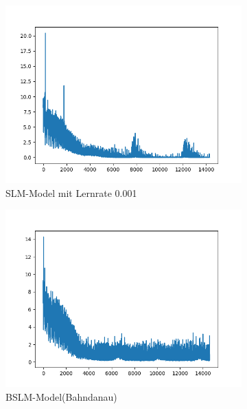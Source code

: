 \begin{figure}[p]
	\centering
	\begin{subfigure}[H]{\textwidth}
		\centering
		\includegraphics[scale=0.55]{images/slm_1e-3_100EP_v5.png}
		\caption{SLM-Model mit Lernrate 0.001}
		\label{NMT_lr1e-3}
	\end{subfigure}
	\begin{subfigure}[H]{\textwidth}
		\centering
		\includegraphics[scale=0.55]{images/bslm_bahdanau_1e_3_100EP.png}
		\caption{BSLM-Model(Bahndanau)}
		\label{BNMT_Bahdanau_lr1e-3}
	\end{subfigure}
	\begin{subfigure}[H]{\textwidth}
		\centering

\end{subfigure}
\end{figure}
